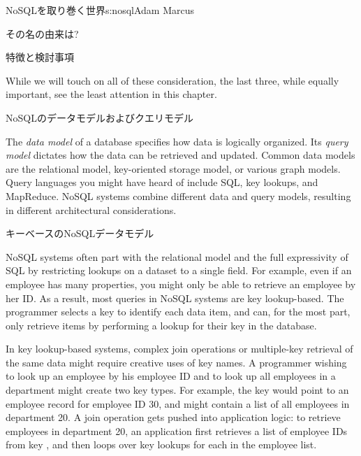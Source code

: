 \begin{aosachapter}{NoSQLを取り巻く世界}{s:nosql}{Adam Marcus}
\begin{aosasect1}{その名の由来は?}
\begin{aosasect2}{特徴と検討事項}
\begin{aosadescription}
\end{aosadescription}

While we will touch on all of these consideration, the last three, while equally important, see the least attention in this chapter.

\end{aosasect2}

\end{aosasect1}

\begin{aosasect1}{NoSQLのデータモデルおよびクエリモデル}

The \emph{data model} of a database specifies how data is logically
organized.  Its \emph{query model} dictates how the data can be
retrieved and updated.  Common data models are the relational model,
key-oriented storage model, or various graph models.  Query languages
you might have heard of include SQL, key lookups, and MapReduce.
NoSQL systems combine different data and query models, resulting in
different architectural considerations.

\begin{aosasect2}{キーベースのNoSQLデータモデル}

NoSQL systems often part with the relational model and the full
expressivity of SQL by restricting lookups on a dataset to a single
field.  For example, even if an employee has many properties, you
might only be able to retrieve an employee by her ID\@.  As a result,
most queries in NoSQL systems are key lookup-based.  The programmer
selects a key to identify each data item, and can, for the most part,
only retrieve items by performing a lookup for their key in the
database.

In key lookup-based systems, complex join operations or multiple-key
retrieval of the same data might require creative uses of key names.
A programmer wishing to look up an employee by his
employee ID and to look up all employees in a department might create
two key types.  For example, the key  would point to an employee
record for employee ID 30, and  might
contain a list of all employees in department 20.  A join operation
gets pushed into application logic: to retrieve employees in
department 20, an application first retrieves a list of employee IDs
from key , and then loops over key
lookups for each  in the employee list.


\end{aosasect2}
\end{aosasect1}
\end{aosachapter}
